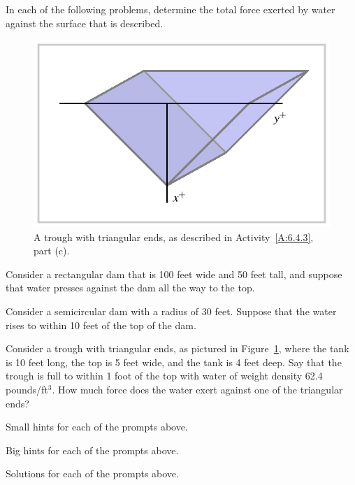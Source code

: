 \begin{activity} \label{A:6.4.3}  In each of the following problems, determine the total force exerted by water against the surface that is described.
\begin{figure}[h]
\begin{center}
\includegraphics{figures/6_4_Act2Trough.eps}
\caption{A trough with triangular ends, as described in Activity~\ref{A:6.4.3}, part (c).} \label{F:6.4.Act3Trough}
\end{center}
\end{figure}
\ba
	\item Consider a rectangular dam that is 100 feet wide and 50 feet tall, and suppose that water presses against the dam all the way to the top.  
	\item Consider a semicircular dam with a radius of 30 feet.  Suppose that the water rises to within 10 feet of the top of the dam.
	\item Consider a trough with triangular ends, as pictured in Figure~\ref{F:6.4.Act3Trough}, where the tank is 10 feet long, the top is 5 feet wide, and the tank is 4 feet deep.  Say that the trough is full to within 1 foot of the top with water of weight density 62.4 pounds/ft$^3$.  How much force does the water exert against one of the triangular ends?
\ea

\end{activity}
\begin{smallhint}
\ba
	\item Small hints for each of the prompts above.
\ea
\end{smallhint}
\begin{bighint}
\ba
	\item Big hints for each of the prompts above.
\ea
\end{bighint}
\begin{activitySolution}
\ba
	\item Solutions for each of the prompts above.
\ea
\end{activitySolution}
\aftera